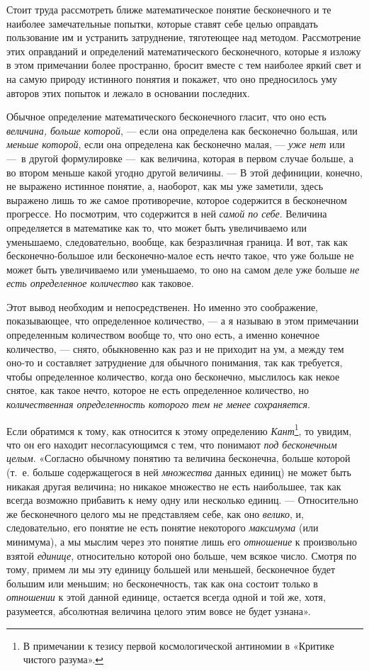 Стоит труда рассмотреть ближе математическое понятие бесконечного и те
наиболее замечательные попытки, которые ставят себе целью оправдать
пользование им и устранить затруднение, тяготеющее над методом.
Рассмотрение этих оправданий и определений математического бесконечного,
которые я изложу в этом примечании более пространно, бросит вместе с тем
наиболее яркий свет и на самую природу истинного понятия и покажет, что оно
предносилось уму авторов этих попыток и лежало в основании последних.

Обычное определение математического бесконечного гласит, что оно есть
{\em величина, больше которой}, — если она определена
как бесконечно большая, или {\em меньше которой}, если
она определена как бесконечно малая, — {\em уже нет}
или —~в другой формулировке —~как величина, которая в первом случае больше,
а во втором меньше какой угодно другой величины. — В этой дефиниции,
конечно, не выражено истинное понятие, а, наоборот, как мы уже заметили,
здесь выражено лишь то же самое противоречие, которое содержится в
бесконечном прогрессе. Но посмотрим, что содержится в ней
{\em самой по себе}. Величина определяется в математике
как то, что может быть увеличиваемо или уменьшаемо, следовательно, вообще,
как безразличная граница. И вот, так как бесконечно-большое или
бесконечно-малое есть нечто такое, что уже больше не может быть
увеличиваемо или уменьшаемо, то оно на самом деле уже больше
{\em не есть определенное количество} как таковое.

Этот вывод необходим и непосредственен. Но именно это соображение,
показывающее, что определенное количество, — а я называю в этом примечании
определенным количеством вообще то, что оно есть, а именно конечное
количество, — снято, обыкновенно как раз и не приходит на ум, а между тем
оно-то и составляет затруднение для обычного понимания, так как требуется,
чтобы определенное количество, когда оно бесконечно, мыслилось как некое
снятое, как такое нечто, которое не есть определенное количество, но
{\em количественная определенность которого тем не
менее сохраняется}.

Если обратимся к тому, как относится к этому определению
{\em Кант}\footnote{В примечании к тезису
первой космологической антиномии в «Критике чистого разума».}, то увидим,
что он его находит несогласующимся с тем, что понимают
{\em под бесконечным целым}. «Согласно обычному понятию
та величина бесконечна, больше которой (т.~е. больше содержащегося в ней
{\em множества} данных единиц) не может быть никакая
другая величина; но никакое множество не есть наибольшее, так как всегда
возможно прибавить к нему одну или несколько единиц. — Относительно же
бесконечного целого мы не представляем себе, как оно
{\em велико}, и, следовательно, его понятие не есть
понятие некоторого {\em максимума} (или минимума), а мы
мыслим через это понятие лишь его {\em отношение} к
произвольно взятой {\em единице}, относительно которой
оно больше, чем всякое число. Смотря по тому, примем ли мы эту единицу
большей или меньшей, бесконечное будет большим или меньшим; но
бесконечность, так как она состоит только в
{\em отношении} к этой данной единице, остается всегда
одной и той же, хотя, разумеется, абсолютная величина целого этим вовсе не
будет узнана».

